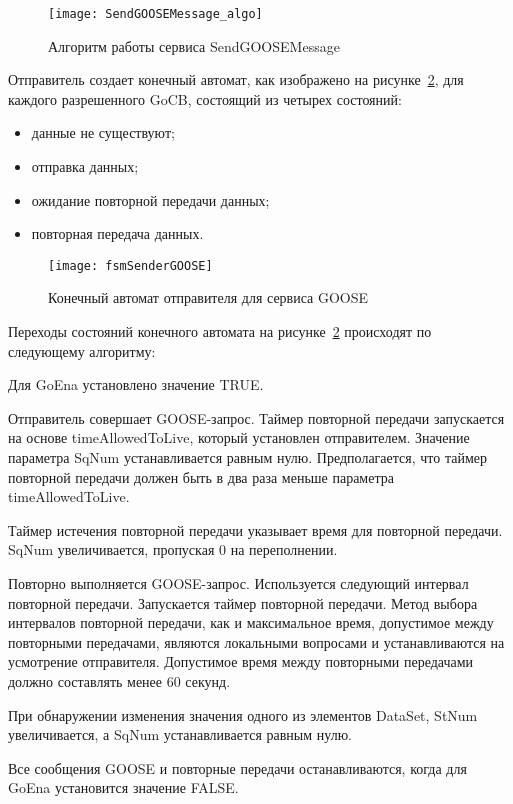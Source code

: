 \begin{figure}[ht]
    \centering
    \texttt{[image: SendGOOSEMessage\_algo]}
    \caption{Алгоритм работы сервиса SendGOOSEMessage}
    \label{pic::domain::send_goose_msg_algo}
\end{figure}

Отправитель создает конечный автомат, как изображено на
рисунке~\ref{pic::domain::fsm_sender_goose}, для каждого
разрешенного GoCB, состоящий из четырех состояний:
\begin{itemize}
    \item данные не существуют;
    \item отправка данных;
    \item ожидание повторной передачи данных;
    \item повторная передача данных.
\end{itemize}


\begin{figure}[ht]
    \centering
    \texttt{[image: fsmSenderGOOSE]}
    \caption{Конечный автомат отправителя для сервиса GOOSE}
    \label{pic::domain::fsm_sender_goose}
\end{figure}

Переходы состояний конечного автомата на рисунке~\ref{pic::domain::fsm_sender_goose}
происходят по следующему алгоритму:
\begin{enumerate_num}
    \item Для GoEna установлено значение TRUE.
    \item Отправитель совершает GOOSE-запрос. Таймер повторной передачи запускается
    на основе timeAllowedToLive, который установлен отправителем. Значение параметра
    SqNum устанавливается равным нулю. Предполагается, что таймер повторной передачи
    должен быть в два раза меньше параметра timeAllowedToLive.
    \item Таймер истечения повторной передачи указывает время для повторной
    передачи. SqNum увеличивается, пропуская 0 на переполнении.
    \item Повторно выполняется GOOSE-запрос. Используется следующий интервал
    повторной передачи. Запускается таймер повторной передачи. Метод выбора
    интервалов повторной передачи, как и максимальное время, допустимое между
    повторными передачами, являются локальными вопросами и устанавливаются
    на усмотрение отправителя. Допустимое время между повторными передачами должно
    составлять менее 60 секунд.
    \item При обнаружении изменения значения одного из элементов DataSet,
    StNum увеличивается, а SqNum устанавливается равным нулю.
    \item Все сообщения GOOSE и повторные передачи останавливаются, когда для GoEna
    установится значение FALSE.
\end{enumerate_num}

